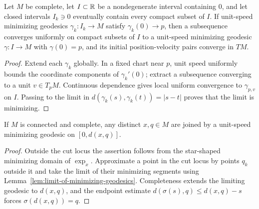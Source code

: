 \begin{lemma}
\label{lem:limit-of-minimizing-geodesics}





Let $M$ be complete, let $I\subset\mathbb{R}$ be a nondegenerate interval
containing $0$, and let closed intervals $I_k\ni0$ eventually contain
every compact subset of $I$. If unit-speed minimizing geodesics
$\gamma_k\colon I_k\to M$ satisfy $\gamma_k(0)\to p$, then a subsequence
converges uniformly on compact subsets of $I$ to a unit-speed minimizing
geodesic $\gamma\colon I\to M$ with $\gamma(0)=p$, and its initial
position-velocity pairs converge in $TM$.
\end{lemma}
\begin{proof}
\sketch
{}
Extend each $\gamma_k$ globally. In a fixed chart near $p$, unit speed
uniformly bounds the coordinate components of $\gamma_k'(0)$; extract a
subsequence converging to a unit $v\in T_pM$. Continuous dependence gives
local uniform convergence to $\gamma_{p,v}$ on $I$. Passing to the limit
in
$d(\gamma_k(s),\gamma_k(t))=|s-t|$ proves that the limit is minimizing.
\end{proof}

\begin{lemma}
\label{lem:minimizing-segment-exists}





If $M$ is connected and complete, any distinct $x,q\in M$ are joined by
a unit-speed minimizing geodesic on $[0,d(x,q)]$.
\end{lemma}
\begin{proof}
\sketch

Outside the cut locus the assertion follows from the star-shaped
minimizing domain of $\exp_x$. Approximate a point in the cut locus by
points $q_k$ outside it and take the limit of their minimizing segments
using Lemma~\ref{lem:limit-of-minimizing-geodesics}. Completeness extends
the limiting geodesic to $d(x,q)$, and the endpoint estimate
$d(\sigma(s),q)\le d(x,q)-s$ forces $\sigma(d(x,q))=q$.
\end{proof}

